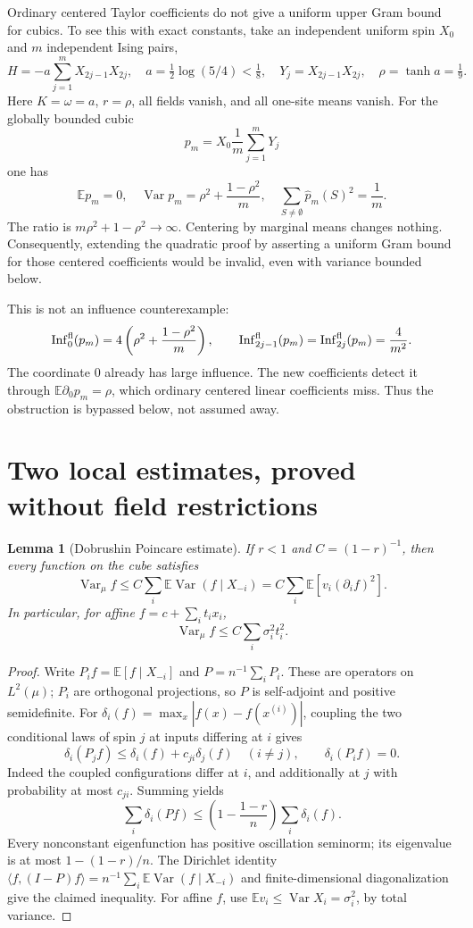 \documentclass[11pt]{article}
\newtheorem{lemma}[theorem]{Lemma}
\newcommand{\E}{\mathbb E}
\newcommand{\Var}{\operatorname{Var}}
\newcommand{\Inf}{\operatorname{Inf}}
\begin{document}
Ordinary centered Taylor coefficients do not give a uniform upper
Gram bound for cubics. To see this with exact constants, take an
independent uniform spin $X_0$ and $m$ independent Ising pairs,
\[
 H=-a\sum_{j=1}^m X_{2j-1}X_{2j},\quad
 a=\tfrac12\log(5/4)<\tfrac18,\quad
 Y_j=X_{2j-1}X_{2j},\quad \rho=\tanh a=\tfrac19.
\]
Here $K=\omega=a$, $r=\rho$, all fields vanish, and all one-site
means vanish. For the globally bounded cubic
\[
 p_m=X_0\frac1m\sum_{j=1}^mY_j
\]
one has
\[
 \E p_m=0,\quad
 \Var p_m=\rho^2+\frac{1-\rho^2}{m},\quad
 \sum_{S\ne\emptyset}\widehat p_m(S)^2=\frac1m.
\]
The ratio is $m\rho^2+1-\rho^2\to\infty$. Centering by marginal
means changes nothing. Consequently, extending the quadratic proof
by asserting a uniform Gram bound for those centered coefficients
would be invalid, even with variance bounded below.

This is not an influence counterexample:
\[
 \Inf_0^{\rm fl}(p_m)=4\left(\rho^2+\frac{1-\rho^2}{m}\right),
 \qquad \Inf_{2j-1}^{\rm fl}(p_m)=\Inf_{2j}^{\rm fl}(p_m)=\frac4{m^2}.
\]
The coordinate $0$ already has large influence. The new coefficients
detect it through $\E\partial_0p_m=\rho$, which ordinary centered
linear coefficients miss. Thus the obstruction is bypassed below,
not assumed away.

\section{Two local estimates, proved without field restrictions}

\begin{lemma}[Dobrushin Poincare estimate]\label{lem:poincare}
If $r<1$ and $C=(1-r)^{-1}$, then every function on the cube satisfies
\[
 \Var_\mu f\le C\sum_i\E\Var(f\mid X_{-i})
 =C\sum_i\E[v_i(\partial_i f)^2].
\]
In particular, for affine $f=c+\sum_i t_ix_i$,
\[
 \Var_\mu f\le C\sum_i\sigma_i^2t_i^2.
\]
\end{lemma}
\begin{proof}
Write $P_i f=\E[f\mid X_{-i}]$ and $P=n^{-1}\sum_iP_i$.
These are operators on $L^2(\mu)$; $P_i$ are orthogonal projections,
so $P$ is self-adjoint and positive semidefinite. For
$\delta_i(f)=\max_x|f(x)-f(x^{(i)})|$, coupling the two conditional
laws of spin $j$ at inputs differing at $i$ gives
\[
 \delta_i(P_j f)\le\delta_i(f)+c_{ji}\delta_j(f)\quad(i\ne j),
 \qquad \delta_i(P_i f)=0.
\]
Indeed the coupled configurations differ at $i$, and additionally
at $j$ with probability at most $c_{ji}$. Summing yields
\[
 \sum_i\delta_i(Pf)\le
 \left(1-\frac{1-r}{n}\right)\sum_i\delta_i(f).
\]
Every nonconstant eigenfunction has positive oscillation seminorm;
its eigenvalue is at most $1-(1-r)/n$. The Dirichlet identity
$\langle f,(I-P)f\rangle=n^{-1}\sum_i\E\Var(f\mid X_{-i})$
and finite-dimensional diagonalization give the claimed inequality.
For affine $f$, use $\E v_i\le\Var X_i=\sigma_i^2$, by total variance.
\end{proof}
\end{document}

